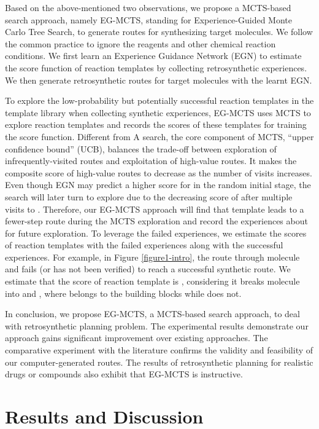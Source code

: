 \documentclass[sn-mathphys,Numbered]{sn-jnl}
\begin{document}
Based on the above-mentioned two observations, we propose a MCTS-based search approach, namely EG-MCTS, standing for Experience-Guided Monte Carlo Tree Search, to generate routes for synthesizing target molecules. We follow the common practice to ignore the reagents and other chemical reaction conditions. We first learn an Experience Guidance Network (EGN) to estimate the score function of reaction templates by collecting retrosynthetic experiences. We then generate retrosynthetic routes for target molecules with the learnt EGN. 

To explore the low-probability but potentially successful reaction templates in the template library when collecting synthetic experiences, EG-MCTS uses MCTS to explore reaction templates and records the scores of these templates for training the score function. 
Different from A search, the core component of MCTS, “upper confidence bound” (UCB), balances the trade-off between exploration of infrequently-visited routes and exploitation of high-value routes. It makes the composite score of high-value routes to decrease as the number of visits increases.
Even though EGN may predict a higher score for  in the random initial stage, the search will later turn to explore  due to the decreasing score of   after multiple visits to . 
Therefore, our EG-MCTS approach will find that template  leads to a fewer-step route during the MCTS exploration and record the experiences about  for future exploration.
To leverage the failed experiences, we estimate the scores of reaction templates with the failed experiences along with the successful experiences. For example, in Figure \ref{figure1-intro}, the route through molecule  and  fails (or has not been verified) to reach a successful synthetic route. We estimate that the score of reaction template  is , considering it breaks molecule  into  and , where  belongs to the building blocks while  does not.

In conclusion, we propose EG-MCTS, a MCTS-based search approach, to deal with retrosynthetic planning problem. 
The experimental results demonstrate our approach gains significant improvement over existing approaches. 
The comparative experiment with the literature confirms the validity and feasibility of our computer-generated routes. 
The results of retrosynthetic planning for realistic drugs or compounds also exhibit that EG-MCTS is instructive.


\section{Results and Discussion }\label{sec2}
\end{document}
